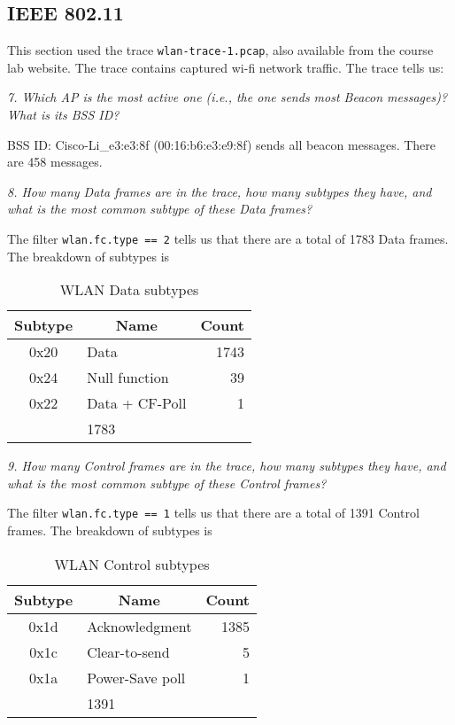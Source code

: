 \subsection{IEEE 802.11}\label{sec:proc-wifi}
This section used the trace \texttt{wlan-trace-1.pcap}, also available from the course lab website. The trace contains captured wi-fi network traffic. The trace tells us:

\textit{7. Which AP is the most active one (i.e., the one sends most Beacon messages)? What is its BSS ID?}

BSS ID: Cisco-Li\_e3:e3:8f (00:16:b6:e3:e9:8f) sends all beacon messages. There are 458 messages.

\textit{8. How many Data frames are in the trace, how many subtypes they have, and what is the most common subtype of these Data frames?}

The filter \texttt{wlan.fc.type == 2} tells us that there are a total of 1783 Data frames. The breakdown of subtypes is

\begin{table}[htpb]
	\centering
	\caption{WLAN Data subtypes}
	\label{table:data}
	\begin{tabular}{@{}clr@{}}
		\toprule
		Subtype & \multicolumn{1}{c}{Name} & \multicolumn{1}{c}{Count} \\ \midrule
		0x20 & Data & 1743 \\
		0x24 & Null function & 39 \\
		0x22 & Data + CF-Poll & 1 \\ \hhline{~~=}
		\multicolumn{2}{r}{Total} & 1783 \\ %
	\end{tabular}
\end{table}

\newpage
\textit{9. How many Control frames are in the trace, how many subtypes they have, and what is the most common subtype of these Control frames?}

The filter \texttt{wlan.fc.type == 1} tells us that there are a total of 1391 Control frames. The breakdown of subtypes is

\begin{table}[htpb]
	\centering
	\caption{WLAN Control subtypes}
	\label{table:control}
	\begin{tabular}{@{}clr@{}}
		\toprule
		Subtype & \multicolumn{1}{c}{Name} & \multicolumn{1}{c}{Count} \\ \midrule
		0x1d & Acknowledgment & 1385 \\
		0x1c & Clear-to-send & 5 \\
		0x1a & Power-Save poll & 1 \\ \hhline{~~=}
		\multicolumn{2}{r}{Total} & 1391 \\ %
	\end{tabular}
\end{table}

